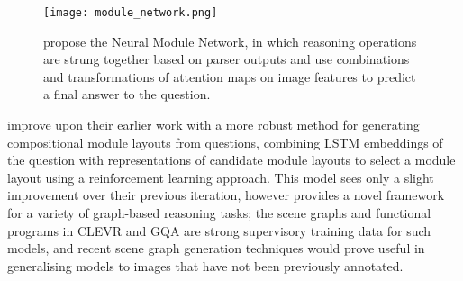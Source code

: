 \begin{figure}[H]
    \centering
    \texttt{[image: module\_network.png]}
    \caption{\citeauthor{andreas2016neural} propose the Neural Module Network, in which reasoning operations are strung together based on parser outputs and use combinations and transformations of attention maps on image features to predict a final answer to the question.}
    \label{fig:andreas2016neural_neural_module_network}
\end{figure}

\citeauthor{andreas2016learning} improve upon their earlier work with a more robust method for generating compositional module layouts from questions, combining LSTM embeddings of the question with representations of candidate module layouts to select a module layout using a reinforcement learning approach. This model sees only a slight improvement over their previous iteration, however provides a novel framework for a variety of graph-based reasoning tasks; the scene graphs and functional programs in CLEVR and GQA are strong supervisory training data for such models, and recent scene graph generation techniques \cite{yang2018graph} would prove useful in generalising models to images that have not been previously annotated.






